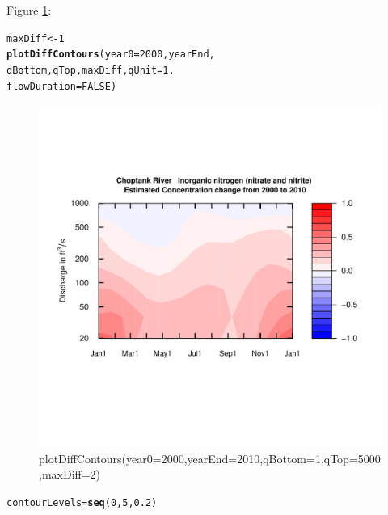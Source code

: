 \documentclass[a4paper,11pt]{article}\usepackage[]{graphicx}\usepackage[]{color}
\makeatletter
\newcommand{\hlnum}[1]{\textcolor[rgb]{0.686,0.059,0.569}{#1}}%
\newcommand{\hlstd}[1]{\textcolor[rgb]{0.345,0.345,0.345}{#1}}%
\newcommand{\hlkwb}[1]{\textcolor[rgb]{0.69,0.353,0.396}{#1}}%
\newcommand{\hlkwc}[1]{\textcolor[rgb]{0.333,0.667,0.333}{#1}}%
\newcommand{\hlkwd}[1]{\textcolor[rgb]{0.737,0.353,0.396}{\textbf{#1}}}%
\newenvironment{kframe}{%
 \def\at@end@of@kframe{}%
 \ifinner\ifhmode%
  \def\at@end@of@kframe{\end{minipage}}%
  \begin{minipage}{\columnwidth}%
 \fi\fi%
 \def\FrameCommand##1{\hskip\@totalleftmargin \hskip-\fboxsep
 \colorbox{shadecolor}{##1}\hskip-\fboxsep
     \hskip-\linewidth \hskip-\@totalleftmargin \hskip\columnwidth}%
 \MakeFramed {\advance\hsize-\width
   \@totalleftmargin\z@ \linewidth\hsize
   \@setminipage}}%
 {\par\unskip\endMakeFramed%
 \at@end@of@kframe}
\newenvironment{knitrout}{}{} %
\makeatother
\begin{document}
Figure \ref{fig:plotDiffContours}:
\begin{knitrout}
\color{fgcolor}\begin{kframe}
\begin{alltt}
\hlstd{maxDiff}\hlkwb{<-}\hlnum{1}
\hlkwd{plotDiffContours}\hlstd{(}\hlkwc{year0}\hlstd{=}\hlnum{2000}\hlstd{,yearEnd,}
                 \hlstd{qBottom,qTop,maxDiff,}\hlkwc{qUnit}\hlstd{=}\hlnum{1}\hlstd{,}
             \hlkwc{flowDuration}\hlstd{=}\hlnum{FALSE}\hlstd{)}
\end{alltt}
\end{kframe}\begin{figure}[]

\includegraphics[width=1\linewidth,height=1\linewidth]{figure/plotDiffContours} \caption[plotDiffContours(year0=2000,yearEnd=2010,qBottom=1,qTop=5000,maxDiff=2)]{plotDiffContours(year0=2000,yearEnd=2010,qBottom=1,qTop=5000,maxDiff=2)\label{fig:plotDiffContours}}
\end{figure}


\end{knitrout}





\begin{knitrout}
\color{fgcolor}\begin{kframe}
\begin{alltt}
\hlstd{contourLevels} \hlkwb{=} \hlkwd{seq}\hlstd{(}\hlnum{0}\hlstd{,}\hlnum{5}\hlstd{,}\hlnum{0.2}\hlstd{)}
\end{alltt}
\end{kframe}
\end{knitrout}
\end{document}
